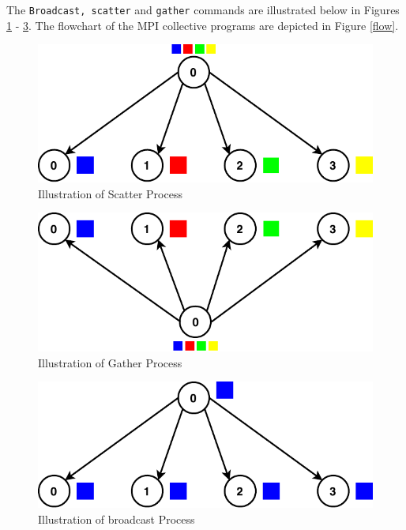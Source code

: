 \documentclass[10.5 pt, conference]{IEEEtran}
\begin{document}
The \verb|Broadcast, scatter| and \verb|gather| commands are illustrated below in Figures \ref{scatter} - \ref{broadcast}. The flowchart of the MPI collective  programs are depicted in Figure \ref{flow}.

\begin{figure}[h!]
\centering
\includegraphics[width=0.9\columnwidth]{MPI_Scatter.pdf}
\centering
\caption{Illustration of Scatter Process}
\label{scatter}
\end{figure}

\begin{figure}[h!]
\centering
\includegraphics[width=0.9\columnwidth]{MPI_Gather.pdf}
\centering
\caption{Illustration of Gather Process}
\label{gather}
\end{figure}

\begin{figure}[h!]
\centering
\includegraphics[width=0.9\columnwidth]{MPI_broadcast.pdf}
\centering
\caption{Illustration of broadcast Process}
\label{broadcast}
\end{figure}
\end{document}
